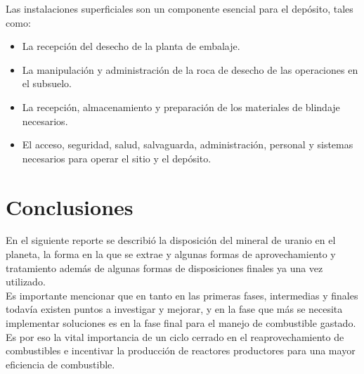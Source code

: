 \documentclass[]{article}
\begin{document}
 Las instalaciones superficiales son un componente esencial para el depósito, tales como:\\
 
 \begin{itemize}
 	\item La recepción del desecho de la planta de embalaje.
 	\item La manipulación y administración de la roca de desecho de las operaciones en el subsuelo.
 	\item La recepción, almacenamiento y preparación de los materiales de blindaje necesarios.
 	\item El acceso, seguridad, salud, salvaguarda, administración, personal y sistemas necesarios para operar el sitio y el depósito.
 \end{itemize}

\section{Conclusiones}

En el siguiente reporte se describió la disposición del mineral de uranio en el planeta, la forma en la que se extrae y algunas formas de aprovechamiento y tratamiento además de algunas formas de disposiciones finales ya una vez utilizado.\\

Es importante mencionar que en tanto en las primeras fases, intermedias y finales todavía existen puntos a investigar y mejorar, y en la fase que más se necesita implementar soluciones es en la fase final para el manejo de combustible gastado. Es por eso la vital importancia de un ciclo cerrado en el reaprovechamiento de combustibles e incentivar la producción de reactores productores para una mayor eficiencia de combustible.\\


%
%
\end{document}
